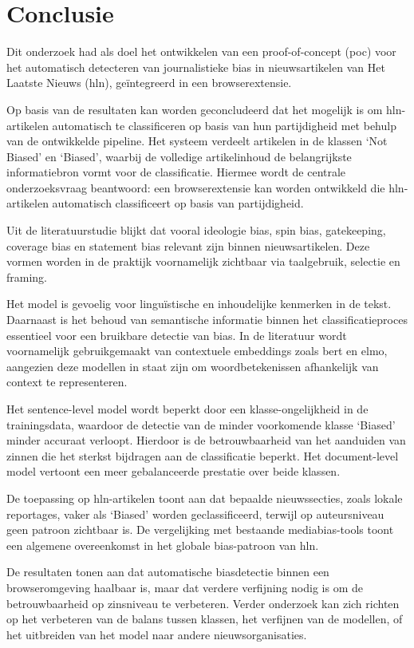 \chapter{Conclusie}
\label{ch:conclusie}

Dit onderzoek had als doel het ontwikkelen van een proof-of-concept (\gls{poc}) voor het automatisch detecteren van journalistieke bias in nieuwsartikelen van Het Laatste Nieuws (\gls{hln}), geïntegreerd in een browserextensie.

Op basis van de resultaten kan worden geconcludeerd dat het mogelijk is om \gls{hln}-artikelen automatisch te classificeren op basis van hun partijdigheid met behulp van de ontwikkelde pipeline. Het systeem verdeelt artikelen in de klassen `Not Biased' en `Biased', waarbij de volledige artikelinhoud de belangrijkste informatiebron vormt voor de classificatie. Hiermee wordt de centrale onderzoeksvraag beantwoord: een browserextensie kan worden ontwikkeld die \gls{hln}-artikelen automatisch classificeert op basis van partijdigheid.

Uit de literatuurstudie blijkt dat vooral ideologie bias, spin bias, gatekeeping, coverage bias en statement bias relevant zijn binnen nieuwsartikelen. Deze vormen worden in de praktijk voornamelijk zichtbaar via taalgebruik, selectie en framing.

Het model is gevoelig voor linguïstische en inhoudelijke kenmerken in de tekst. Daarnaast is het behoud van semantische informatie binnen het classificatieproces essentieel voor een bruikbare detectie van bias. In de literatuur wordt voornamelijk gebruikgemaakt van contextuele embeddings zoals \gls{bert} en \gls{elmo}, aangezien deze modellen in staat zijn om woordbetekenissen afhankelijk van context te representeren.

Het sentence-level model wordt beperkt door een klasse-ongelijkheid in de trainingsdata, waardoor de detectie van de minder voorkomende klasse `Biased' minder accuraat verloopt. Hierdoor is de betrouwbaarheid van het aanduiden van zinnen die het sterkst bijdragen aan de classificatie beperkt. Het document-level model vertoont een meer gebalanceerde prestatie over beide klassen.

De toepassing op \gls{hln}-artikelen toont aan dat bepaalde nieuwssecties, zoals lokale reportages, vaker als `Biased' worden geclassificeerd, terwijl op auteursniveau geen patroon zichtbaar is. De vergelijking met bestaande mediabias-tools toont een algemene overeenkomst in het globale bias-patroon van \gls{hln}.

De resultaten tonen aan dat automatische biasdetectie binnen een browseromgeving haalbaar is, maar dat verdere verfijning nodig is om de betrouwbaarheid op zinsniveau te verbeteren. Verder onderzoek kan zich richten op het verbeteren van de balans tussen klassen, het verfijnen van de modellen, of het uitbreiden van het model naar andere nieuwsorganisaties.